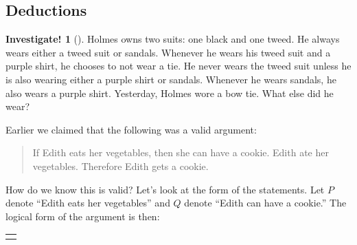 \documentclass[12pt,]{book}
\theoremstyle{plain}
\theoremstyle{definition}
\theoremstyle{definition}
\theoremstyle{definition}
\newtheorem{investigation}[project]{Investigate!}
\numberwithin{equation}{chapter}
\newcommand{\hrulethin}  {\noalign{\hrule height 0.04em}}
\newlength{\panelmax}
\newcommand{\imp}{\rightarrow}
\begin{document}
\subsection[{Deductions}]{Deductions}\label{subsection-21}
\begin{investigation}[]\label{investigation-16}
\hypertarget{p-1242}{}%
Holmes owns two suits: one black and one tweed. He always wears either a tweed suit or sandals. Whenever he wears his tweed suit and a purple shirt, he chooses to not wear a tie. He never wears the tweed suit unless he is also wearing either a purple shirt or sandals. Whenever he wears sandals, he also wears a purple shirt. Yesterday, Holmes wore a bow tie. What else did he wear?%
\end{investigation}
\hypertarget{p-1243}{}%
Earlier we claimed that the following was a valid argument:%
\begin{quote}\hypertarget{blockquote-8}{}
\hypertarget{p-1244}{}%
If Edith eats her vegetables, then she can have a cookie. Edith ate her vegetables. Therefore Edith gets a cookie.%
\end{quote}
\hypertarget{p-1245}{}%
How do we know this is valid? Let's look at the form of the statements. Let \(P\) denote ``Edith eats her vegetables'' and \(Q\) denote ``Edith can have a cookie.'' The logical form of the argument is then:%
{%
\setlength{\panelmax}{0pt}
\ifdefined\panelboxAtabular\else\newsavebox{\panelboxAtabular}\fi%
\savebox{\panelboxAtabular}{%
\raisebox{\depth}{\parbox{1\linewidth}{\centering\begin{tabular}{cc}
&\(P \imp Q\)\tabularnewline[0pt]
&\(P\)\tabularnewline\hrulethin
\(\therefore\)&\(Q\)
\end{tabular}
}}}
\ifdefined\phAtabular\else\newlength{\phAtabular}\fi%
\setlength{\phAtabular}{\ht\panelboxAtabular+\dp\panelboxAtabular}
\settototalheight{\phAtabular}{\usebox{\panelboxAtabular}}
\setlength{\panelmax}{\maxof{\panelmax}{\phAtabular}}
\leavevmode%
\setlength{\tabcolsep}{0\linewidth}
\par\medskip\noindent
\begin{tabular}{@{}*{1}{c}@{}}
\begin{minipage}[c][\panelmax][t]{1\linewidth}\usebox{\panelboxAtabular}\end{minipage}\end{tabular}\\
}%
\end{document}
